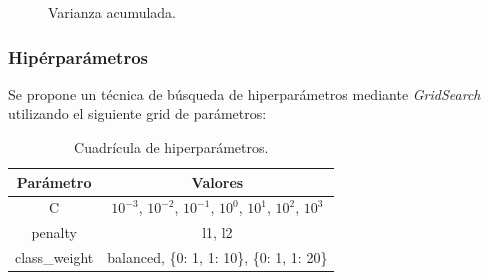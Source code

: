 \documentclass[12pt,letterpaper]{article}
\begin{document}
\begin{figure}[H]
        \centering
        \caption{Varianza acumulada.}
        \label{fig:funcion_sigmoide}
\end{figure}


\subsubsection{Hipérparámetros}

Se propone un técnica de búsqueda de hiperparámetros mediante \textit{GridSearch} utilizando el siguiente grid de parámetros:

\begin{table}[H]
\centering
\begin{tabular}{|c|c|}
\hline
\textbf{Parámetro} & \textbf{Valores} \\ \hline
C & $10^{-3}$, $10^{-2}$, $10^{-1}$, $10^{0}$, $10^{1}$, $10^{2}$, $10^{3}$ \\ \hline
penalty & l1, l2 \\ \hline
class\_weight & balanced, \{0: 1, 1: 10\}, \{0: 1, 1: 20\} \\ \hline
\end{tabular}
\caption{Cuadrícula de hiperparámetros.}
\label{tab:grid}
\end{table}
\end{document}
